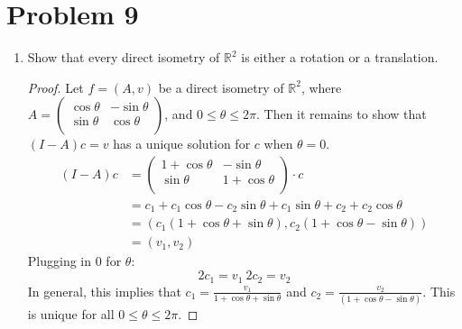 \documentclass[a4paper,12pt]{extarticle}
\theoremstyle{definition}
\newcommand{\R}{\mathbb{R}} \newcommand{\Q}{\mathbb{Q}} \newcommand{\Z}{\mathbb{Z}} \newcommand{\N}{\mathbb{N}} \newcommand{\myskip}{\par\null\par} \renewcommand\qedsymbol{QED} \renewcommand{\leq}{\leqslant}\renewcommand{\geq}{\geqslant}
\begin{document}
            \section*{Problem 9}\begin{enumerate}[label=(\alph*)]
                \item Show that every direct isometry of $\R^2$ is either a rotation or a translation.\begin{proof}
                Let $f=(A,v)$ be a direct isometry of $\R^2$, where $A=\begin{pmatrix}
            \cos\theta & -\sin\theta\\
            \sin\theta & \cos\theta\\
            \end{pmatrix}$, and $0\leq\theta\leq2\pi$. Then it remains to show that $(I-A)c=v$ has a unique solution for $c$ when $\theta=0$. \begin{align*}
                (I-A)c&=\begin{pmatrix}
            1+\cos\theta & -\sin\theta\\
            \sin\theta & 1+\cos\theta\\
            \end{pmatrix}\cdot c\\
            &=c_1+c_1\cos\theta-c_2\sin\theta+c_1\sin\theta+c_2+c_2\cos\theta\\
            &=(c_1(1+\cos\theta+\sin\theta),c_2(1+\cos\theta-\sin\theta))\\
            &=(v_1,v_2)
            \end{align*} Plugging in $0$ for $\theta$: $$2c_1=v_1\ 2c_2=v_2$$ In general, this implies that $c_1=\frac{v_1}{1+\cos\theta+\sin\theta}$ and $c_2=\frac{v_2}{(1+\cos\theta-\sin\theta)}$. This is unique for all $0\leq\theta\leq2\pi$.
                \end{proof}
            \end{enumerate}
\end{document}
